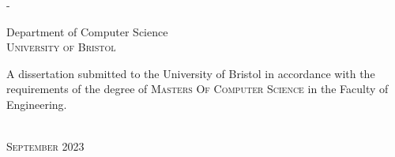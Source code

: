 \begin{titlingpage}
\begin{SingleSpace}
\begin{adjustwidth*}{\unitlength}{-\unitlength}
\begin{center}
\vspace{6mm}
{\large Department of Computer Science\\
\textsc{University of Bristol}}\\
\vspace{11mm}
\begin{minipage}{10cm}
A dissertation submitted to the University of Bristol in accordance with the requirements of the degree of \textsc{Masters Of Computer Science} in the Faculty of Engineering.
\end{minipage}\\
\vspace{9mm}
{\large\textsc{September 2023}}
\vspace{12mm}
\end{center}
\begin{flushright}
\end{flushright}
\end{adjustwidth*}
\end{SingleSpace}
\end{titlingpage}